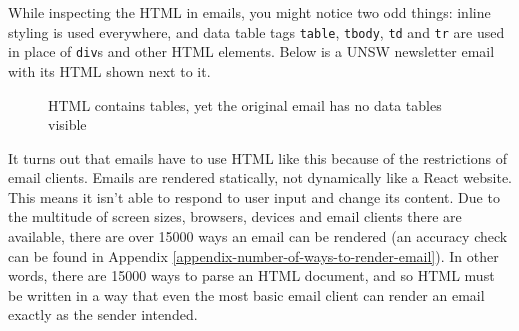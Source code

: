 \documentclass{article}
\begin{document}
While inspecting the HTML in emails, you might notice two odd things: inline styling is used everywhere, and data table tags \texttt{table}, \texttt{tbody}, \texttt{td} and \texttt{tr} are used in place of \texttt{div}s and other HTML elements. Below is a UNSW newsletter email with its HTML shown next to it.

\begin{figure}[H]
    \centering
    \qquad
    \caption{HTML contains tables, yet the original email has no data tables visible}
\end{figure}

It turns out that emails have to use HTML like this because of the restrictions of email clients. Emails are rendered statically, not dynamically like a React website. This means it isn't able to respond to user input and change its content. Due to the multitude of screen sizes, browsers, devices and email clients there are available, there are over 15000 ways an email can be rendered (an accuracy check can be found in Appendix \ref{appendix-number-of-ways-to-render-email}). In other words, there are 15000 ways to parse an HTML document, and so HTML must be written in a way that even the most basic email client can render an email exactly as the sender intended.
\end{document}
